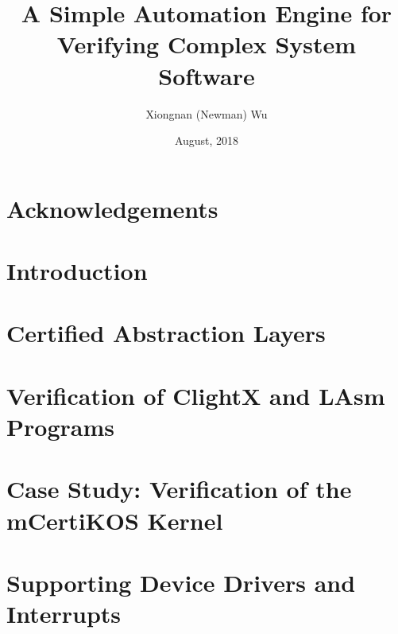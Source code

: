 \documentclass[letterpaper,11pt]{yalephd}
\begin{document}
\title{A Simple Automation Engine for Verifying Complex System Software}
\author{Xiongnan (Newman) Wu}
\date{August, 2018} %

\frontmatter

\begin{abstract}

\end{abstract}


\maketitle
{} %
\tableofcontents
\listoffigures %
\listoftables %

\chapter{Acknowledgements} %


\mainmatter

\chapter{Introduction}

\chapter{Certified Abstraction Layers}
\label{chapter:framework}


\chapter{Verification of ClightX and LAsm Programs}
\label{chapter:automation}


\chapter{Case Study: Verification of the mCertiKOS Kernel}
\label{chapter:sequential}


\chapter{Supporting Device Drivers and Interrupts}
\label{chapter:driver}
\end{document}
